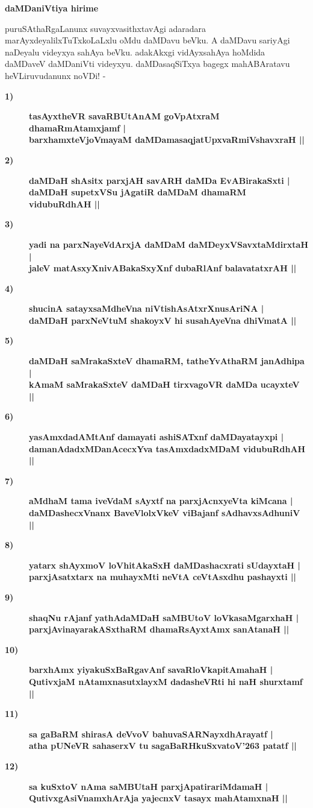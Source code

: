 {\bigskip
\noindent
{\large\bf daMDaniVtiya hirime}}\label{page96}
\medskip

\noindent
puruSAthaRgaLanunx suvayxvasithxtavAgi adaradara marAyxdeyalilxTuTxkoLaLxlu oMdu daMDavu beVku. A daMDavu sariyAgi naDeyalu videyxya sahAya beVku. adakAkxgi vidAyxsahAya hoMdida daMDaveV daMDaniVti videyxyu. daMDasaqSiTxya bagegx mahABAratavu heVLiruvudanunx noVDi! -

\begin{description}
\item [\bf 1)] {\bf tasAyxtheVR savaRBUtAnAM goVpAtxraM dhamaRmAtamxjamf |}\\\label{96} 
{\bf barxhamxteVjoVmayaM daMDamasaqjatUpxvaRmiVshavxraH ||}
\item [\bf 2)] {\bf daMDaH shAsitx parxjAH savARH daMDa EvABirakaSxti |}\\ 
{\bf daMDaH supetxVSu jAgatiR daMDaM dhamaRM vidubuRdhAH ||}
\item [\bf 3)] {\bf yadi na parxNayeVdArxjA daMDaM daMDeyxVSavxtaMdirxtaH |}\\ 
{\bf jaleV matAsxyXnivABakaSxyXnf dubaRlAnf balavatatxrAH ||}
\item [\bf 4)] {\bf shucinA satayxsaMdheVna niVtishAsAtxrXnusAriNA |}\\ 
{\bf daMDaH parxNeVtuM shakoyxV hi susahAyeVna dhiVmatA ||}

\item [\bf 5)] {\bf daMDaH saMrakaSxteV dhamaRM, tatheYvAthaRM janAdhipa |}\\
{\bf  kAmaM saMrakaSxteV daMDaH tirxvagoVR daMDa ucayxteV ||}
\item [\bf 6)] {\bf yasAmxdadAMtAnf damayati ashiSATxnf daMDayatayxpi |}\\ 
{\bf damanAdadxMDanAcecxYva tasAmxdadxMDaM vidubuRdhAH ||}
\item [\bf 7)] {\bf aMdhaM tama iveVdaM sAyxtf na parxjAcnxyeVta kiMcana |}\\ 
{\bf daMDashecxVnanx BaveVlolxVkeV viBajanf sAdhavxsAdhuniV ||}
\item [\bf 8)] {\bf yatarx shAyxmoV loVhitAkaSxH daMDashacxrati sUdayxtaH |}\\ 
{\bf parxjAsatxtarx na muhayxMti neVtA ceVtAsxdhu pashayxti ||}
\item [\bf 9)] {\bf shaqNu rAjanf yathAdaMDaH saMBUtoV loVkasaMgarxhaH |}\\ 
{\bf parxjAvinayarakASxthaRM dhamaRsAyxtAmx sanAtanaH ||}
\item [\bf 10)] {\bf barxhAmx yiyakuSxBaRgavAnf savaRloVkapitAmahaH |}\\ 
{\bf QutivxjaM nAtamxnasutxlayxM dadasheVRti hi naH shurxtamf ||}
\item [\bf 11)] {\bf sa gaBaRM shirasA deVvoV bahuvaSARNayxdhArayatf |}\\
{\bf  atha pUNeVR sahaserxV tu sagaBaRHkuSxvatoV\char'263 patatf ||}
\item [\bf 12)] {\bf sa kuSxtoV nAma saMBUtaH parxjApatirariMdamaH |}\\ 
{\bf QutivxgAsiVnamxhArAja yajecnxV tasayx mahAtamxnaH ||}


\end{description}
